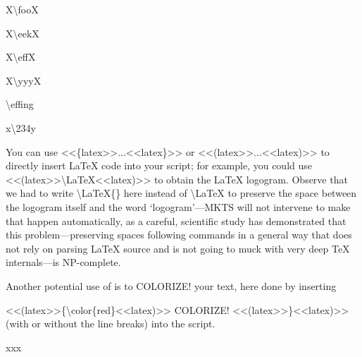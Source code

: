 
X\textbackslash{}fooX\mktsShowpar\par
X\textbackslash{}eekX\mktsShowpar\par
X\textbackslash{}effX\mktsShowpar\par
X\textbackslash{}yyyX\mktsShowpar\par
\textbackslash{}effing\mktsShowpar\par
x\textbackslash{}234y\mktsShowpar\par
\begin{multicols}{2}
You can use {\mktsStyleCode{}<<\{latex>>...<<latex\}>>} or {\mktsStyleCode{}<<(latex>>...<<latex)>>} to directly insert LaTeX
code into your script; for example, you could
use {\mktsStyleCode{}<<(latex>>\textbackslash{}LaTeX<<latex)>>}
to obtain the \LaTeX{} logogram.
Observe that we had to write {\mktsStyleCode{}\textbackslash{}LaTeX\{\}} here instead of {\mktsStyleCode{}\textbackslash{}LaTeX} to preserve the space between the logogram itself and
the word ‘logogram’—MKTS will not intervene to make that happen
automatically, as a careful, scientific study has demonstrated
that this problem—preserving spaces following commands in a
general way that does not rely on parsing \LaTeX{}
source and is not going to muck with very deep
\TeX{}
internals—is NP-complete.\mktsShowpar\par
Another potential use of  is to {\color{red}COLORIZE!} your text, here done by inserting\mktsShowpar\par
\begingroup\obeyalllines\mktsStyleCode{}<<(latex>>\{\textbackslash{}color\{red\}<<latex)>>
COLORIZE!
<<(latex>>\}<<latex)>>
\endgroup{}(with or without the line breaks) into the script.
\end{multicols}xxx\mktsShowpar\par

